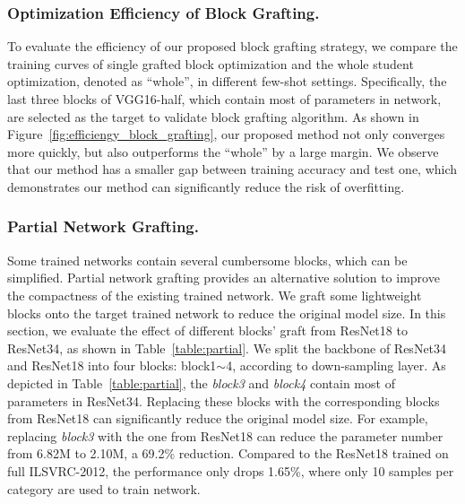 \documentclass[letterpaper]{article} %
\begin{document}
{{        \subsubsection{Optimization Efficiency of Block Grafting.}
        {
            To evaluate the efficiency of our proposed block grafting strategy, we compare the training curves of single grafted block optimization and the whole student optimization, denoted as ``whole'', in different few-shot settings.
            Specifically, the last three blocks of VGG16-half, which contain most of parameters in network, are selected as the target to validate block grafting algorithm. 
            As shown in Figure~\ref{fig:efficiengy_block_grafting}, our proposed method not only converges more quickly, but also outperforms the ``whole'' by a large margin. 
            We observe that our method has a smaller gap between training accuracy and test one, which demonstrates our method can significantly reduce the risk of overfitting. 

        }


        \subsubsection{Partial Network Grafting.}
        {
            Some trained networks contain several cumbersome blocks, which can be simplified. 
            Partial network grafting provides an alternative solution to improve the compactness of the existing trained network. 
            We graft some lightweight blocks onto the target trained network to reduce the original model size.
            In this section, we evaluate the effect of different blocks' graft from ResNet18 to ResNet34, as shown in Table~\ref{table:partial}.
            We split the backbone of ResNet34 and ResNet18 into four blocks: block1$\sim$4, according to down-sampling layer.
            As depicted in Table~\ref{table:partial}, the \emph{block3} and \emph{block4} contain most of parameters in ResNet34.
            Replacing these blocks with the corresponding blocks from ResNet18 can significantly reduce the original model size.
            For example, replacing \emph{block3} with the one from ResNet18 can reduce the parameter number from 6.82M to 2.10M, a 69.2\% reduction.
            Compared to the ResNet18 trained on full ILSVRC-2012, the performance only drops 1.65\%, where only 10 samples per category are used to train network. 

}}}
\end{document}
